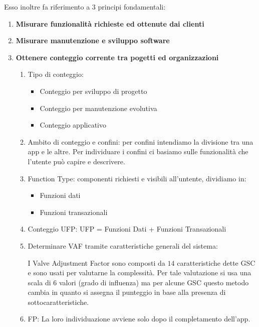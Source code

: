 \documentclass{report}
\begin{document}
\noindent
Esso inoltre fa riferimento a 3 principi fondamentali:
\begin{enumerate}
    \item \textbf{Misurare funzionalità richieste ed ottenute dai clienti}
    \item \textbf{Misurare manutenzione e sviluppo software}
    \item \textbf{Ottenere conteggio corrente tra pogetti ed organizzazioni}
    \begin{enumerate}
        \item Tipo di conteggio:
        \begin{itemize}
            \item Conteggio per sviluppo di progetto
            \item Conteggio per manutenzione evolutiva
            \item Conteggio applicativo
        \end{itemize}
        \item Ambito di conteggio e confini: per confini intendiamo la divisione tra una app e le altre. Per individuare i confini ci basiamo sulle funzionalità che l'utente può capire e descrivere.
        \item Function Type: componenti richiesti e visibili all'untente, dividiamo in:
        \begin{itemize}
            \item Funzioni dati
            \item Funzioni transazionali
        \end{itemize}
        \item Conteggio UFP: UFP = Funzioni Dati + Funzioni Transazionali
        \item Determinare VAF tramite caratteristiche generali del sistema:

        \noindent
        I Valve Adjustment Factor sono composti da $14$ caratteristiche dette GSC e sono usati per valutarne la complessità. Per tale valutazione si usa una scala di 6 valori (grado di influenza) ma per alcune GSC questo metodo cambia in quanto si assegna il punteggio in base alla presenza di sottocaratteristiche.

        \item FP: La loro individuazione avviene solo dopo il completamento dell'app.
    \end{enumerate}
\end{enumerate}

\newpage
\chapter{}
\end{document}
